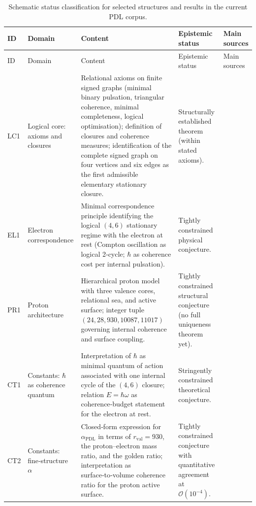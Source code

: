 \documentclass{article}
\newcommand{\PDL}{\mathrm{PDL}}
\begin{document}
\begin{longtable}{L{0.8cm}L{2.5cm}L{5cm}L{3.2cm}L{1cm}}
\caption{Schematic status classification for selected structures and results in the current PDL corpus.}
\label{tab:status}\\
\toprule
ID & Domain & Content & Epistemic status & Main sources \\
\midrule
\endfirsthead
\toprule
ID & Domain & Content & Epistemic status & Main sources \\
\midrule
\endhead
\bottomrule
\endfoot

LC1 &
Logical core: axioms and closures &
Relational axioms on finite signed graphs (minimal binary pulsation, triangular coherence, minimal completeness, logical optimisation); definition of closures and coherence measures; identification of the complete signed graph on four vertices and six edges as the first admissible elementary stationary closure. &
Structurally established theorem (within stated axioms). &
\citep{PDL_Main_2026,Minimal_Stationary_Closures_2026,PDL_intro,PDL_position} \\[0.4em]

EL1 &
Electron correspondence &
Minimal correspondence principle identifying the logical $(4,6)$ stationary regime with the electron at rest (Compton oscillation as logical 2‑cycle; $\hbar$ as coherence cost per internal pulsation). &
Tightly constrained physical conjecture. &
\citep{PDL_Main_2026,PDL_intro,PDL_position} \\[0.4em]

PR1 &
Proton architecture &
Hierarchical proton model with three valence cores, relational sea, and active surface; integer tuple $(24,28,930,10087,11017)$ governing internal coherence and surface coupling. &
Tightly constrained structural conjecture (no full uniqueness theorem yet). &
\citep{Combinatorial_Proton_v2_2026,Proton_Local_Uniqueness_2026,PDL_intro,PDL_position} \\[0.4em]

CT1 &
Constants: $\hbar$ as coherence quantum &
Interpretation of $\hbar$ as minimal quantum of action associated with one internal cycle of the $(4,6)$ closure; relation $E=\hbar\omega$ as coherence‑budget statement for the electron at rest. &
Stringently constrained theoretical conjecture. &
\citep{PDL_Main_2026,PDL_intro,PDL_position} \\[0.4em]

CT2 &
Constants: fine‑structure $\alpha$ &
Closed‑form expression for $\alpha_{\PDL}$ in terms of $r_{\mathrm{val}}=930$, the proton–electron mass ratio, and the golden ratio; interpretation as surface‑to‑volume coherence ratio for the proton active surface. &
Tightly constrained conjecture with quantitative agreement at $\mathcal{O}(10^{-4})$. &
\citep{Alpha_PDL_v2_2026,Born_Golden_v2_2026,PDL_intro,PDL_position} \\[0.4em]


\end{longtable}
\end{document}
